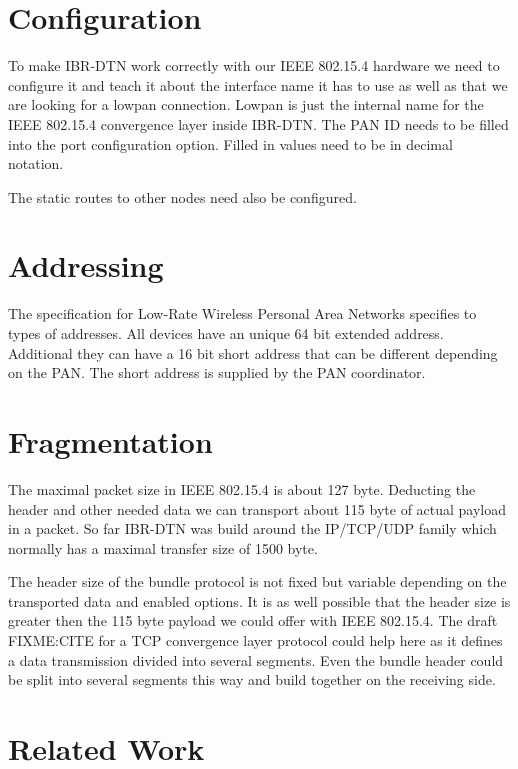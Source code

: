 \section{Configuration}

To make IBR-DTN work correctly with our IEEE 802.15.4 hardware we need to configure
it and teach it about the interface name it has to use as well as that we are
looking for a lowpan connection. Lowpan is just the internal name for the
IEEE 802.15.4 convergence layer inside IBR-DTN. The PAN ID needs to be filled into the
port configuration option. Filled in values need to be in decimal notation.

The static routes to other nodes need also be configured.

\section{Addressing}

The specification for Low-Rate Wireless Personal Area Networks specifies to
types of addresses. All devices have an unique 64 bit extended address.
Additional they can have a 16 bit short address that can be different depending
on the PAN. The short address is supplied by the PAN coordinator.

\section{Fragmentation}

The maximal packet size in IEEE 802.15.4 is about 127 byte. Deducting the header
and other needed data we can transport about 115 byte of actual payload in a
packet. So far IBR-DTN was build around the IP/TCP/UDP family which normally has
a maximal transfer size of 1500 byte.

The header size of the bundle protocol is not fixed but variable depending on
the transported data and enabled options. It is as well possible that the header
size is greater then the 115 byte payload we could offer with IEEE 802.15.4. The
draft FIXME:CITE for a TCP convergence layer protocol could help here as it
defines a data transmission divided into several segments. Even the bundle
header could be split into several segments this way and build together on the
receiving side.

\section{Related Work}

